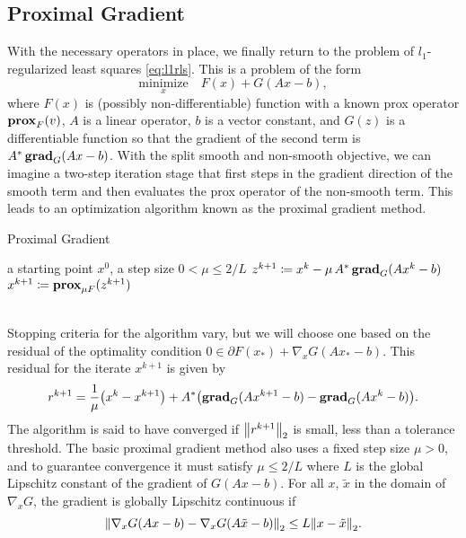 \subsection{Proximal Gradient}
With the necessary operators in place, we finally return to the problem of $l_1$-regularized least squares \eqref{eq:l1rls}. This is a problem of the form
\begin{equation}
 \underset{x}{\mathrm{minimize}} \quad F(x) + G(Ax - b),
\end{equation}
where $F(x)$ is (possibly non-differentiable) function with a known prox operator $\prox_{F} (v)$, $A$ is a linear operator, $b$ is a vector constant, and $G(z)$ is a differentiable function so that the gradient of the second term is $A^* \grad_{G}(Ax - b)$. With the split smooth and non-smooth objective, we can imagine a two-step iteration stage that first steps in the gradient direction of the smooth term and then evaluates the prox operator of the non-smooth term. This leads to an optimization algorithm known as the proximal gradient method.
\begin{algorithm}[h]
 \caption{Proximal Gradient \autocite{PB13}}
 \begin{algorithmic}
  \GIVEN a starting point $x^0$, a step size $0 < \mu \le 2/L$
  \REPEAT
  \STATE $z^{k+1} \coloneqq x^k - \mu \, A^* \grad_{G}(Ax^k - b)$
  \STATE $x^{k+1} \coloneqq \prox_{\mu F}(z^{k+1})$
 \end{algorithmic}
\end{algorithm}\\
Stopping criteria for the algorithm vary, but we will choose one based on the residual of the optimality condition $0 \in \partial F(x_*) + \nabla_x G(Ax_* - b)$. This residual for the iterate $x^{k+1}$ is given by
\begin{equation}
 r^{k+1} = \frac{1}{\mu}\paren*{x^k - x^{k+1}} + A^*\paren*{\grad_G(Ax^{k+1} - b) - \grad_G(Ax^k - b)}.
\end{equation}
The algorithm is said to have converged if $\norm{2}{r^{k+1}}$ is small, less than a tolerance threshold. The basic proximal gradient method also uses a fixed step size $\mu > 0$, and to guarantee convergence it must satisfy $\mu \le 2/L$ where $L$ is the global Lipschitz constant of the gradient of $G(Ax - b)$. For all $x$, $\tilde{x}$ in the domain of $\nabla_x G$, the gradient is globally Lipschitz continuous if
\begin{equation}
 \norm{2}{\nabla_x G(Ax - b) - \nabla_x G(A\tilde{x} - b)} \le L \norm{2}{x - \tilde{x}}.
\end{equation}


